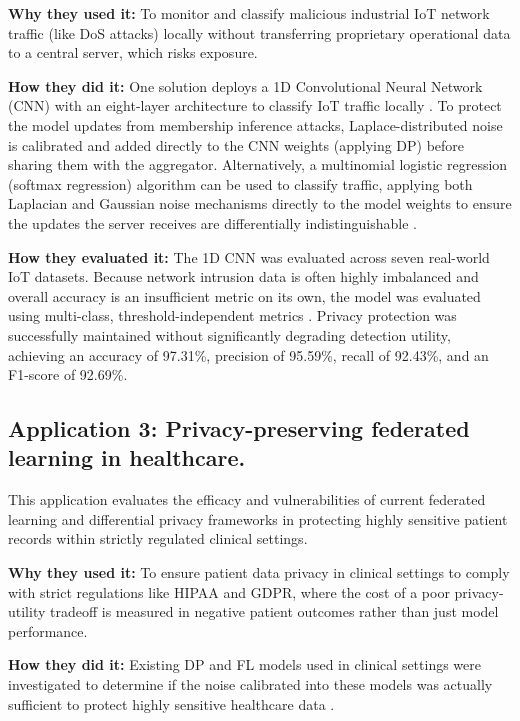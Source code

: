 \documentclass[letterpaper]{article}
\begin{document}
\textbf{Why they used it:} To monitor and classify malicious industrial IoT network traffic (like DoS attacks) locally without transferring proprietary operational data to a central server, which risks exposure.

\textbf{How they did it:} One solution deploys a 1D Convolutional Neural Network (CNN) with an eight-layer architecture to classify IoT traffic locally \parencite{torre2025}. To protect the model updates from membership inference attacks, Laplace-distributed noise is calibrated and added directly to the CNN weights (applying DP) before sharing them with the aggregator. Alternatively, a multinomial logistic regression (softmax regression) algorithm can be used to classify traffic, applying both Laplacian and Gaussian noise mechanisms directly to the model weights to ensure the updates the server receives are differentially indistinguishable \parencite{ruzafa2023}.

\textbf{How they evaluated it:} The 1D CNN was evaluated across seven real-world IoT datasets. Because network intrusion data is often highly imbalanced and overall accuracy is an insufficient metric on its own, the model was evaluated using multi-class, threshold-independent metrics \parencite{torre2025}. Privacy protection was successfully maintained without significantly degrading detection utility, achieving an accuracy of 97.31\%, precision of 95.59\%, recall of 92.43\%, and an F1-score of 92.69\%.

\pagebreak

\subsection*{Application 3: Privacy-preserving federated learning in healthcare.}
This application evaluates the efficacy and vulnerabilities of current federated learning and differential privacy frameworks in protecting highly sensitive patient records within strictly regulated clinical settings.

\textbf{Why they used it:} To ensure patient data privacy in clinical settings to comply with strict regulations like HIPAA and GDPR, where the cost of a poor privacy-utility tradeoff is measured in negative patient outcomes rather than just model performance.

\textbf{How they did it:} Existing DP and FL models used in clinical settings were investigated to determine if the noise calibrated into these models was actually sufficient to protect highly sensitive healthcare data \parencite{teo2024}.
\end{document}

